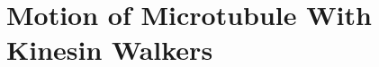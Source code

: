 \documentclass[11pt]{ucthesis}
\def\bu{{\bf u}}
\begin{document}



\section{Motion of Microtubule With Kinesin Walkers}

\end{document}
